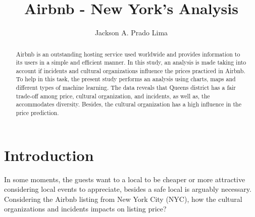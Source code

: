 \documentclass[sigconf]{acmart}
\begin{document}
	
\title{Airbnb - New York’s Analysis}

\author{Jackson A. Prado Lima}
	
\renewcommand{\shortauthors}{J. A. Prado Lima}
\renewcommand{\shorttitle}{Airbnb - New York’s Analysis}

\begin{abstract}
	Airbnb is an outstanding hosting service used worldwide and provides information to its users in a simple and efficient manner. In this study, an analysis is made taking into account if incidents and cultural organizations influence the prices practiced in Airbnb. To help in this task, the present study performs an analysis using charts, maps and different types of machine learning. The data reveals that Queens district has a fair trade-off among price, cultural organization, and incidents, as well as, the accommodates diversity. Besides, the cultural organization has a high influence in the price prediction.
\end{abstract}


\maketitle

\section{Introduction}


In some moments, the guests want to a local to be cheaper or more attractive considering local events to appreciate, besides a safe local is arguably necessary. Considering the Airbnb listing from New York City (NYC), how the cultural organizations and incidents impacts on listing price? 
\end{document}
